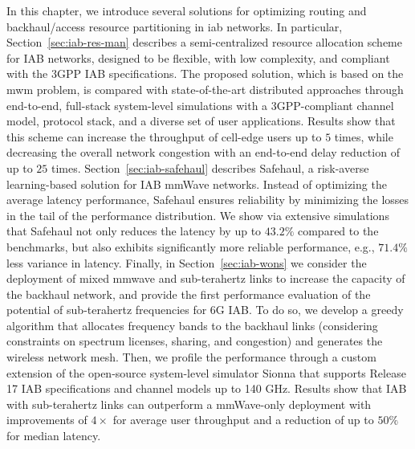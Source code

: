 In this chapter, we introduce several solutions for optimizing routing and backhaul/access resource partitioning in \gls{iab} networks.
In particular, Section~\ref{sec:iab-res-man} describes a semi-centralized resource allocation scheme for IAB networks, designed to be flexible, with low complexity, and compliant with the 3GPP IAB specifications. The proposed solution, which is based on the \gls{mwm} problem, is compared with state-of-the-art distributed approaches through end-to-end, full-stack system-level simulations with a 3GPP-compliant channel model, protocol stack, and a diverse set of user applications. Results show that this scheme can increase the throughput of cell-edge users up to $5$ times, while decreasing the overall network congestion with an end-to-end delay reduction of up to $25$ times.
Section~\ref{sec:iab-safehaul} describes Safehaul, a risk-averse learning-based solution for IAB mmWave networks. Instead of optimizing the average latency performance, Safehaul ensures reliability by minimizing the losses in the tail of the performance distribution.
We show via extensive simulations that Safehaul not only reduces the latency by up to $43.2\%$ compared to the benchmarks, but also exhibits significantly more reliable performance, e.g., $71.4\%$ less variance in latency.
Finally, in Section~\ref{sec:iab-wons} we consider the deployment of mixed \gls{mmwave} and sub-terahertz links to increase the capacity of the backhaul network, and provide the first performance evaluation of the potential of sub-terahertz frequencies for 6G IAB. 
To do so, we develop a greedy algorithm that allocates frequency bands to the backhaul links (considering constraints on spectrum licenses, sharing, and congestion) and generates the wireless network mesh. Then, we profile the performance through a custom extension of the open-source
system-level simulator Sionna that supports Release 17 IAB specifications and channel models up to 140 GHz. Results
show that IAB with sub-terahertz links can outperform a mmWave-only deployment with improvements of $4\times$ for average
user throughput and a reduction of up to $50\%$ for median latency.


